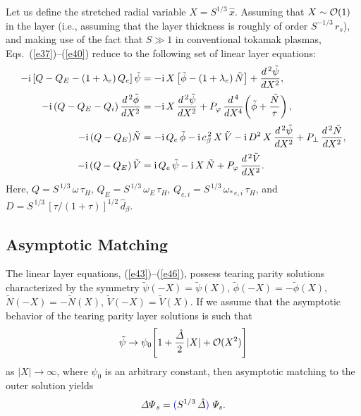 \documentclass[12pt,prb,aps]{revtex4-1}
\providecommand{\DIFadd}[1]{{\protect\color{blue}\uwave{#1}}} %
\providecommand{\DIFdel}[1]{{\protect\color{red}\sout{#1}}}                      %
\providecommand{\DIFaddbegin}{} %
\providecommand{\DIFaddend}{} %
\providecommand{\DIFdelbegin}{} %
\providecommand{\DIFdelend}{} %
\begin{document}
 Let us define the stretched radial variable $X = S^{1/3}\,\hat{x}$.
Assuming that $X\sim{\cal O}(1)$ in the layer (i.e., assuming that the layer thickness is roughly of order $S^{-1/3}\,r_s$),
and making use of the fact that $S\gg 1$ in conventional tokamak plasmas,  Eqs.~(\ref{e37})--(\ref{e40}) reduce to the following
set of linear layer equations:\,\cite{cole}
\begin{align}\label{e43}
-{\rm i}\,[Q-Q_E-(1+\lambda_e)\,Q_{e}]\,\tilde{\psi}&= - {\rm i}\,X\left[\tilde{\phi}-(1+\lambda_e)\,\tilde{N}\right] + \frac{d^{\,2}\tilde{\psi}}{d X^2},\\[0.5ex]
-{\rm i}\,(Q-Q_E -Q_{i})\,\frac{d^{\,2}\tilde{\phi}}{dX^2}&= - {\rm i}\,X\,\frac{d^{\,2}\tilde{\psi}}{dX^2}+ P_\varphi\,\frac{d^{\,4}}{dX^4}\!\left(\tilde{\phi} + \frac{\tilde{N}}{\tau}\right),\\[0.5ex]
-{\rm i}\,(Q-Q_E)\tilde{N} &= - {\rm i}\,Q_{e}\,\tilde{\phi} - {\rm i}\,c_\beta^{\,2}\,X\,\tilde{V}  - {\rm i} \,D^{2}\,X\,\frac{d^{\,2}\tilde{\psi}}{dX^{2}}
+ P_\perp\,\frac{d^{\,2} \tilde{N}}{dX^{2}},\\[0.5ex]
 -{\rm i}\,(Q-Q_E)\,\tilde{V} &= {\rm i}\,Q_{e}\,\tilde{\psi} - {\rm i}\,X\,\tilde{N} + P_\varphi\,\frac{d^{\,2}\tilde{V}}{dX^{2}}.\label{e46}
\end{align}
Here, $Q=S^{\,1/3}\,\omega\,\tau_H$, $Q_E = S^{\,1/3}\,\omega_E\,\tau_H$, $Q_{e,i} = S^{\,1/3}\,\omega_{\ast\,e,i}\,\tau_H$,
and \DIFdelbegin \DIFdel{$D = S^{\,1/3}\,[\tau/(1+\tau)]^{1/2}\,\hat{d}_\beta$}\DIFdelend \DIFaddbegin \DIFadd{$D = S^{\,1/3}\,\tau_e^{1/2}\,\hat{d}_\beta$}\DIFaddend . 

\subsection{Asymptotic Matching}
The  linear layer equations, (\ref{e43})--(\ref{e46}), possess tearing parity solutions
characterized by the symmetry $\tilde{\psi}(-X)=\tilde\psi(X)$, $\tilde{\phi}(-X)=-\tilde{\phi}(X)$, 
$\tilde{N}(-X)= - \tilde{N}(X)$, $\tilde{V}(-X)=\tilde{V}(X)$. If we assume that
the asymptotic behavior of the tearing parity layer solutions is such that 
\begin{equation}\label{e47}
\tilde{\psi}\rightarrow  \psi_0\!\left[1+ \frac{\hat{\mit\Delta}}{2}\,|X| + {\cal O}(X^2)\right]
\end{equation}
as $|X|\rightarrow\infty$, where $\psi_0$ is an arbitrary constant, then asymptotic matching to the outer solution yields
\begin{equation}\label{e48}
{\mit\Delta\Psi}_s= \DIFaddbegin \DIFadd{(}\DIFaddend S^{1/3}\,\hat{\mit\Delta}\DIFaddbegin \DIFadd{)}\DIFaddend \,\,{\mit\Psi}_s.
\end{equation}
\end{document}
